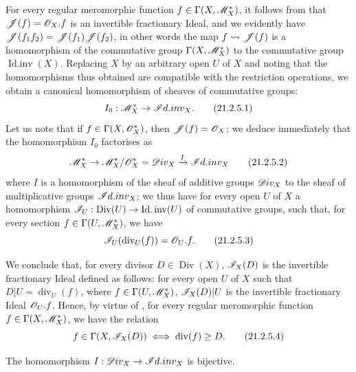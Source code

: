 \begin{env}[21.2.5]
\label{IV.21.2.5}
For every regular meromorphic function $f\in\Gamma(X,\mathscr{M}_X^*)$, it follows from  that $\mathscr{J}(f)=\mathscr{O}_X.f$ is an invertible fractionary Ideal, and we evidently have $\mathscr{J}(f_1f_2)=\mathscr{J}(f_1)\mathscr{J}(f_2)$, in other words the map $f\leadsto\mathscr{J}(f)$ is a homomorphism of the commutative group $\Gamma(X,\mathscr{M}_X^*)$ to the commutative group $\operatorname{Id.inv}(X)$.
Replacing $X$ by an arbitrary open $U$ of $X$ and noting that the homomorphisms thus obtained are compatible with the restriction operations, we obtain a canonical homomorphism of sheaves of commutative groups:
\[
\label{IV.21.2.5.1}
  I_0:\mathscr{M}_X^*\to\mathscr{I}d.inv_X.
  \tag{21.2.5.1}
\]
Let us note that if $f\in\Gamma(X,\mathscr{O}_X^*)$, then $\mathscr{J}(f)=\mathscr{O}_X$;
we deduce immediately that the homomorphism $I_0$ factorises as
\[
\label{IV.21.2.5.2}
  \mathscr{M}_X^*\to\mathscr{M}_X^*/\mathscr{O}_X^*=\mathscr{D}iv_X\xrightarrow{I}\mathscr{I}d.inv_X
  \tag{21.2.5.2}
\]
where $I$ is a homomorphism of the sheaf of additive groups $\mathscr{D}iv_X$ to the sheaf of multiplicative groups $\mathscr{I}d.inv_X$;
we thus have for every open $U$ of $X$ a homomorphism $\mathscr{I}_U:\operatorname{Div}(U)\to\operatorname{Id.inv}(U)$ of commutative groups, such that, for every section $f\in\Gamma(U,\mathscr{M}_X^*)$, we have
\[
\label{IV.21.2.5.3}
  \mathscr{I}_U(\operatorname{div}_U(f))=\mathscr{O}_U.f.
  \tag{21.2.5.3}
\]

We conclude that, for every divisor $D\in\operatorname{Div}(X)$, $\mathscr{I}_X(D)$ is the invertible fractionary Ideal defined as follows:
for every open $U$ of $X$ such that $D|U=\operatorname{div}_U(f)$, where $f\in\Gamma(U,\mathscr{M}_X^*)$, $\mathscr{I}_X(D)|U$ is the invertible fractionary Ideal $\mathscr{O}_U.f$.
Hence, by virtue of , for every regular meromorphic function $f\in\Gamma(X,\mathscr{M}_X^*)$, we have the relation
\[
\label{IV.21.2.5.4}
  f\in\Gamma(X,\mathscr{I}_X(D)) \iff \operatorname{div}(f)\geq D.
  \tag{21.2.5.4}
\]
\end{env}

\begin{proposition}[21.2.6]
\label{IV.21.2.6}
The homomorphism $I:\mathscr{D}iv_X\to\mathscr{I}d.inv_X$ is bijective.
\end{proposition}


